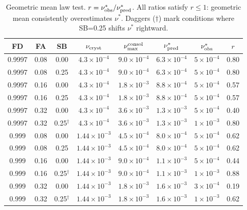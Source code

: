 \documentclass[11pt]{article}
\begin{document}
\begin{table}[h]
\centering
\caption{Geometric mean law test. $r = \nu^*_{\rm obs}/\nu^*_{\rm pred}$.
All ratios satisfy $r \leq 1$: geometric mean consistently overestimates $\nu^*$.
Daggers ($\dagger$) mark conditions where SB=0.25 shifts $\nu^*$ rightward.}
\label{tab:geom_mean}
\small
\begin{tabular}{cccc|ccc|c}
\toprule
FD & FA & SB & $\nu_{\rm cryst}$ & $\nu_{\rm max}^{\rm consol}$ & $\nu^*_{\rm pred}$ & $\nu^*_{\rm obs}$ & $r$ \\
\midrule
0.9997 & 0.08 & 0.00 & $4.3\times10^{-4}$ & $9.0\times10^{-4}$ & $6.3\times10^{-4}$ & $5\times10^{-4}$ & 0.80 \\
0.9997 & 0.08 & 0.25 & $4.3\times10^{-4}$ & $9.0\times10^{-4}$ & $6.3\times10^{-4}$ & $5\times10^{-4}$ & 0.80 \\
0.9997 & 0.16 & 0.00 & $4.3\times10^{-4}$ & $1.8\times10^{-3}$ & $8.8\times10^{-4}$ & $5\times10^{-4}$ & 0.57 \\
0.9997 & 0.16 & 0.25 & $4.3\times10^{-4}$ & $1.8\times10^{-3}$ & $8.8\times10^{-4}$ & $5\times10^{-4}$ & 0.57 \\
0.9997 & 0.32 & 0.00 & $4.3\times10^{-4}$ & $3.6\times10^{-3}$ & $1.3\times10^{-3}$ & $5\times10^{-4}$ & 0.40 \\
0.9997 & 0.32 & 0.25$^\dagger$ & $4.3\times10^{-4}$ & $3.6\times10^{-3}$ & $1.3\times10^{-3}$ & $1\times10^{-3}$ & 0.80 \\
\midrule
0.999 & 0.08 & 0.00 & $1.44\times10^{-3}$ & $4.5\times10^{-4}$ & $8.0\times10^{-4}$ & $5\times10^{-4}$ & 0.62 \\
0.999 & 0.08 & 0.25 & $1.44\times10^{-3}$ & $4.5\times10^{-4}$ & $8.0\times10^{-4}$ & $5\times10^{-4}$ & 0.62 \\
0.999 & 0.16 & 0.00 & $1.44\times10^{-3}$ & $9.0\times10^{-4}$ & $1.1\times10^{-3}$ & $5\times10^{-4}$ & 0.44 \\
0.999 & 0.16 & 0.25$^\dagger$ & $1.44\times10^{-3}$ & $9.0\times10^{-4}$ & $1.1\times10^{-3}$ & $1\times10^{-3}$ & 0.88 \\
0.999 & 0.32 & 0.00 & $1.44\times10^{-3}$ & $1.8\times10^{-3}$ & $1.6\times10^{-3}$ & $3\times10^{-4}$ & 0.19 \\
0.999 & 0.32 & 0.25$^\dagger$ & $1.44\times10^{-3}$ & $1.8\times10^{-3}$ & $1.6\times10^{-3}$ & $1\times10^{-3}$ & 0.62 \\
\bottomrule
\end{tabular}
\end{table}
\end{document}
